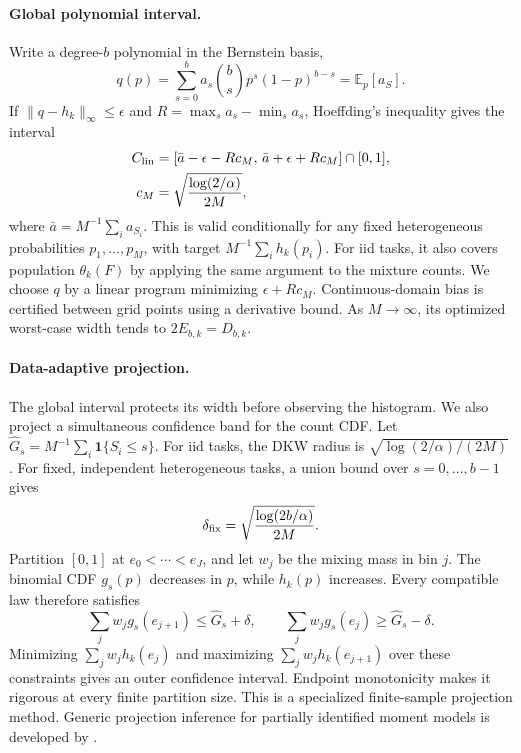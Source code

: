 \documentclass[twoside]{article}
\newcommand{\E}{\mathbb E}
\begin{document}
\paragraph{Global polynomial interval.}
Write a degree-\(b\) polynomial in the Bernstein basis, \[ q(p)=\sum_{s=0}^b a_s\binom bs p^s(1-p)^{b-s} =\E_p[a_S]. \] If \(\|q-h_k\|_\infty\leq\epsilon\) and \(R=\max_sa_s-\min_sa_s\), Hoeffding's inequality \citep{hoeffding1963} gives the interval
\begin{align}
C_{\rm lin}
&=\left[\bar a-\epsilon-Rc_M,\,
        \bar a+\epsilon+Rc_M\right]\cap[0,1],
\nonumber\\
c_M&=\sqrt{\frac{\log(2/\alpha)}{2M}},
\label{eq:global-ci}
\end{align}
where \(\bar a=M^{-1}\sum_i a_{S_i}\). This is valid conditionally for any fixed heterogeneous probabilities \(p_1,\ldots,p_M\), with target \(M^{-1}\sum_i h_k(p_i)\). For iid tasks, it also covers population \(\theta_k(F)\) by applying the same argument to the mixture counts. We choose \(q\) by a linear program minimizing \(\epsilon+Rc_M\). Continuous-domain bias is certified between grid points using a derivative bound. As \(M\to\infty\), its optimized worst-case width tends to \(2E_{b,k}=D_{b,k}\).

\paragraph{Data-adaptive projection.}
The global interval protects its width before observing the histogram. We also project a simultaneous confidence band for the count CDF. Let \(\widehat G_s=M^{-1}\sum_i\mathbf1\{S_i\leq s\}\). For iid tasks, the DKW radius is \(\sqrt{\log(2/\alpha)/(2M)}\) \citep{massart1990}. For fixed, independent heterogeneous tasks, a union bound over \(s=0,\ldots,b-1\) gives \[ \delta_{\rm fix}=\sqrt{\frac{\log(2b/\alpha)}{2M}}. \] Partition \([0,1]\) at \(e_0<\cdots<e_J\), and let \(w_j\) be the mixing mass in bin \(j\). The binomial CDF \(g_s(p)\) decreases in \(p\), while \(h_k(p)\) increases. Every compatible law therefore satisfies \[ \sum_jw_jg_s(e_{j+1})\leq\widehat G_s+\delta,\qquad \sum_jw_jg_s(e_j)\geq\widehat G_s-\delta. \] Minimizing \(\sum_jw_jh_k(e_j)\) and maximizing \(\sum_jw_jh_k(e_{j+1})\) over these constraints gives an outer confidence interval. Endpoint monotonicity makes it rigorous at every finite partition size. This is a specialized finite-sample projection method. Generic projection inference for partially identified moment models is developed by \citet{kaido2019}.
\end{document}
